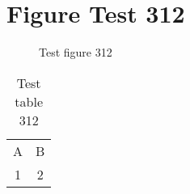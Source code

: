 \documentclass{article}
\begin{document}
\section{Figure Test 312}
\begin{figure}[h]
\caption{Test figure 312}
\end{figure}
\begin{table}[h]
\caption{Test table 312}
\begin{tabular}{cc}
A & B \\
1 & 2
\end{tabular}
\end{table}
\end{document}
